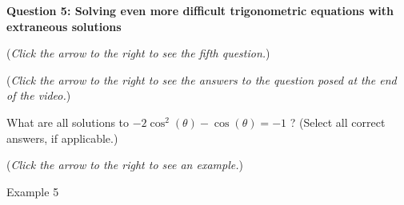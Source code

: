 \documentclass{ximera}
\begin{document}
\textbf{Question 5: Solving even more difficult trigonometric
equations with extraneous solutions}
\begin{question}
\begin{flushright}
{\color{blue}(\emph{Click the arrow to the right to see the fifth question.})}
\end{flushright}
\begin{center}
\begin{expandable}
{\color{blue}(\emph{Click the arrow to the right to see the answers 
to the question posed at the end of the video.})}
\begin{expandable}
What are all solutions to $-2\cos^2(\theta) - \cos(\theta) = -1$
? (Select all correct answers, if applicable.)
\begin{selectAll}
\choice[correct]{$\pi$}
\end{selectAll}
\begin{flushright}
{\color{blue}(\emph{Click the arrow to the right to see an example.})}
\end{flushright}
\begin{expandable}
Example 5
\end{expandable}
\end{expandable}
\end{expandable}
\end{center}
\end{question}
\end{document}
